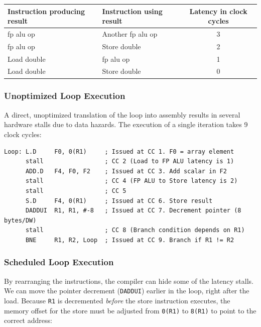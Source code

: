 \begin{table}[htpb]
    \centering
    \renewcommand{\arraystretch}{1.2}
    \begin{tabular}{l l c}
        \textbf{Instruction producing result} & \textbf{Instruction using result} & \textbf{Latency in clock cycles} \\
        \hline
        \gls{fp} \gls{alu} op & Another \gls{fp} \gls{alu} op & 3 \\
        \gls{fp} \gls{alu} op & Store double & 2 \\
        Load double & \gls{fp} \gls{alu} op & 1 \\
        Load double & Store double & 0 \\
        \hline
    \end{tabular}
\end{table}

\subsubsection*{Unoptimized Loop Execution}
A direct, unoptimized translation of the loop into assembly results in several hardware stalls due to data hazards. The execution of a single iteration takes 9 clock cycles:

\begin{lstlisting}[language={[x86masm]Assembler}]
Loop: L.D     F0, 0(R1)     ; Issued at CC 1. F0 = array element
      stall                 ; CC 2 (Load to FP ALU latency is 1)
      ADD.D   F4, F0, F2    ; Issued at CC 3. Add scalar in F2
      stall                 ; CC 4 (FP ALU to Store latency is 2)
      stall                 ; CC 5
      S.D     F4, 0(R1)     ; Issued at CC 6. Store result
      DADDUI  R1, R1, #-8   ; Issued at CC 7. Decrement pointer (8 bytes/DW)
      stall                 ; CC 8 (Branch condition depends on R1)
      BNE     R1, R2, Loop  ; Issued at CC 9. Branch if R1 != R2
\end{lstlisting}

\subsubsection*{Scheduled Loop Execution}
By rearranging the instructions, the compiler can hide some of the latency stalls. We can move the pointer decrement (\texttt{DADDUI}) earlier in the loop, right after the load. Because \texttt{R1} is decremented \textit{before} the store instruction executes, the memory offset for the store must be adjusted from \texttt{0(R1)} to \texttt{8(R1)} to point to the correct address:

